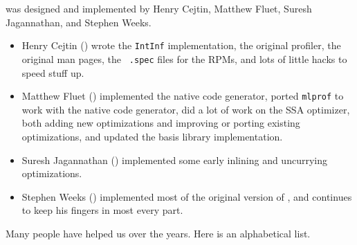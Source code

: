 
{\mlton} was designed and implemented by Henry Cejtin, Matthew Fluet, Suresh
Jagannathan, and Stephen Weeks.

\begin{itemize}

\item
Henry Cejtin () wrote the {\tt IntInf}
implementation, the original profiler, the original man pages, the {\tt
.spec} files for the RPMs, and lots of little hacks to speed stuff up.

\item
Matthew Fluet () implemented the
{\intel} native code generator, ported {\tt mlprof} to work with the
native code generator, did a lot of work on the SSA optimizer, both
adding new optimizations and improving or porting existing
optimizations, and updated the basis library implementation.

\item
Suresh Jagannathan () implemented
some early inlining and uncurrying optimizations.

\item
Stephen Weeks () implemented most of the original
version of {\mlton}, and continues to keep his fingers in most every part.

\end{itemize}
Many people have helped us over the years.  Here is an alphabetical list.

